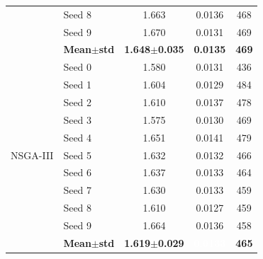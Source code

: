 \begin{table}[H]
\begin{tabular}{@{}llccc@{}}
  & Seed 8 & {\small 1.663} & {\small 0.0136} & {\small 468} \\
  & Seed 9 & {\small 1.670} & {\small 0.0131} & {\small 469} \\
  & \textbf{Mean$\pm$std} & \textbf{1.648$\pm$0.035} & \cellcolor{ForestGreen!25}\textbf{0.0135} & \textbf{469} \\
\midrule
\multirow{11}{*}{NSGA-III}
  & Seed 0 & {\small 1.580} & {\small 0.0131} & {\small 436} \\
  & Seed 1 & {\small 1.604} & {\small 0.0129} & {\small 484} \\
  & Seed 2 & {\small 1.610} & {\small 0.0137} & {\small 478} \\
  & Seed 3 & {\small 1.575} & {\small 0.0130} & {\small 469} \\
  & Seed 4 & {\small 1.651} & {\small 0.0141} & {\small 479} \\
  & Seed 5 & {\small 1.632} & {\small 0.0132} & {\small 466} \\
  & Seed 6 & {\small 1.637} & {\small 0.0133} & {\small 464} \\
  & Seed 7 & {\small 1.630} & {\small 0.0133} & {\small 459} \\
  & Seed 8 & {\small 1.610} & {\small 0.0127} & {\small 459} \\
  & Seed 9 & {\small 1.664} & {\small 0.0136} & {\small 458} \\
  & \textbf{Mean$\pm$std} & \textbf{1.619$\pm$0.029} & \cellcolor{ForestGreen!55}\textcolor{white}{\textbf{0.0133}} & \textbf{465} \\
\bottomrule
\end{tabular}
\end{table}

